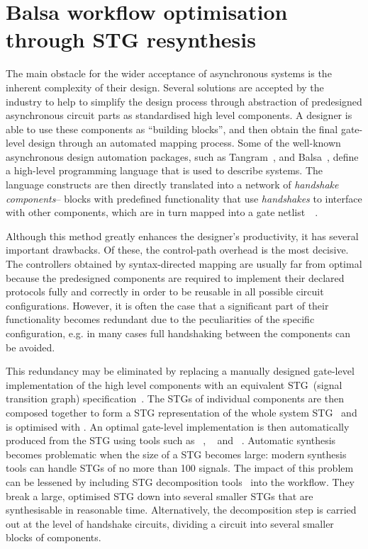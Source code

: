 \section{Balsa workflow optimisation through STG resynthesis}

The main obstacle for the wider acceptance of asynchronous systems is the inherent complexity of their design. Several solutions are
accepted by the industry to help to simplify the design process through abstraction
of predesigned asynchronous circuit parts as standardised high level
components. A designer is able to use these components as ``building
blocks'', and then obtain the final gate-level design through an
automated mapping process. Some of the well-known asynchronous
design automation packages, such as Tangram~\cite{berkel91}, and Balsa~\cite{balsa},
define a high-level programming language that is used to describe
systems. The language constructs are then directly translated into
a network of \emph{handshake components}-- blocks with predefined
functionality that use \emph{handshakes} to interface with other components,
which are in turn mapped into a gate netlist~~\cite{van2004handshake}.

Although this method greatly enhances the designer's productivity,
it has several important drawbacks. Of these, the control-path overhead
is the most decisive. The controllers obtained by syntax-directed
mapping are usually far from optimal because the predesigned components
are required to implement their declared protocols fully and correctly
in order to be reusable in all possible circuit configurations. However,
it is often the case that a significant part of their functionality
becomes redundant due to the peculiarities of the specific configuration,
e.g. in many cases full handshaking between the components can be
avoided.

This redundancy may be eliminated by replacing a manually designed
gate-level implementation of the high level components with an equivalent
STG~(signal transition graph) specification~\cite{Yakovlev_1998_cs}.
The STGs of individual components are then composed together to form a
 STG representation of the whole system STG~\cite{PC-96} and is optimised with \cite{ckkly97}.
An optimal gate-level implementation is then automatically produced
from the STG using tools such as ~\cite{ckkly97},
~\cite{Sentovich:M92/41} and ~\cite{Khomenko_2004_MPSAT}.
Automatic synthesis becomes problematic when the size of a STG becomes
large: modern synthesis tools can handle STGs of no more than 100
signals. The impact of this problem can be lessened by including STG decomposition tools~\cite{DesiJ} into the workflow. They break a large, optimised STG down into several smaller STGs that are synthesisable
in reasonable time. Alternatively, the decomposition step is carried
out at the level of handshake circuits, dividing a circuit into several
smaller blocks of components.



